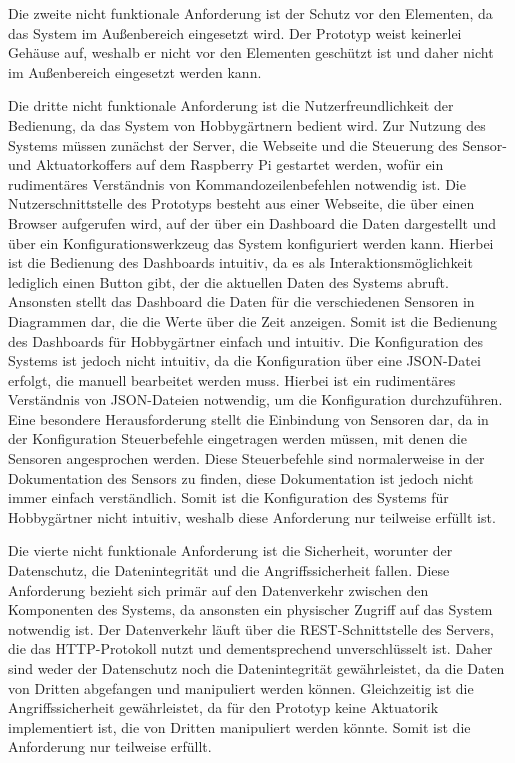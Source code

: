 Die zweite nicht funktionale Anforderung ist der Schutz vor den Elementen, da das System im Außenbereich eingesetzt wird.
Der Prototyp weist keinerlei Gehäuse auf, weshalb er nicht vor den Elementen geschützt ist und daher nicht im Außenbereich eingesetzt werden kann.

Die dritte nicht funktionale Anforderung ist die Nutzerfreundlichkeit der Bedienung, da das System von Hobbygärtnern bedient wird.
Zur Nutzung des Systems müssen zunächst der Server, die Webseite und die Steuerung des Sensor- und Aktuatorkoffers auf dem Raspberry Pi gestartet werden, wofür ein rudimentäres Verständnis von Kommandozeilenbefehlen notwendig ist.
Die Nutzerschnittstelle des Prototyps besteht aus einer Webseite, die über einen Browser aufgerufen wird, auf der über ein Dashboard die Daten dargestellt und über ein Konfigurationswerkzeug das System konfiguriert werden kann.
Hierbei ist die Bedienung des Dashboards intuitiv, da es als Interaktionsmöglichkeit lediglich einen Button gibt, der die aktuellen Daten des Systems abruft.
Ansonsten stellt das Dashboard die Daten für die verschiedenen Sensoren in Diagrammen dar, die die Werte über die Zeit anzeigen.
Somit ist die Bedienung des Dashboards für Hobbygärtner einfach und intuitiv.
Die Konfiguration des Systems ist jedoch nicht intuitiv, da die Konfiguration über eine JSON-Datei erfolgt, die manuell bearbeitet werden muss.
Hierbei ist ein rudimentäres Verständnis von JSON-Dateien notwendig, um die Konfiguration durchzuführen.
Eine besondere Herausforderung stellt die Einbindung von Sensoren dar, da in der Konfiguration Steuerbefehle eingetragen werden müssen, mit denen die Sensoren angesprochen werden.
Diese Steuerbefehle sind normalerweise in der Dokumentation des Sensors zu finden, diese Dokumentation ist jedoch nicht immer einfach verständlich.
Somit ist die Konfiguration des Systems für Hobbygärtner nicht intuitiv, weshalb diese Anforderung nur teilweise erfüllt ist.

Die vierte nicht funktionale Anforderung ist die Sicherheit, worunter der Datenschutz, die Datenintegrität und die Angriffssicherheit fallen.
Diese Anforderung bezieht sich primär auf den Datenverkehr zwischen den Komponenten des Systems, da ansonsten ein physischer Zugriff auf das System notwendig ist.
Der Datenverkehr läuft über die REST-Schnittstelle des Servers, die das HTTP-Protokoll nutzt und dementsprechend unverschlüsselt ist.
Daher sind weder der Datenschutz noch die Datenintegrität gewährleistet, da die Daten von Dritten abgefangen und manipuliert werden können.
Gleichzeitig ist die Angriffssicherheit gewährleistet, da für den Prototyp keine Aktuatorik implementiert ist, die von Dritten manipuliert werden könnte.
Somit ist die Anforderung nur teilweise erfüllt.

